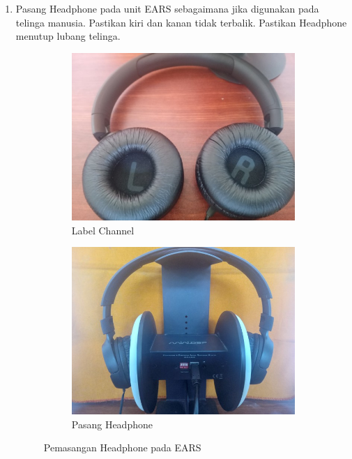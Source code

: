 \documentclass{article}
\begin{document}
	\begin{enumerate}
		\item Pasang Headphone pada unit EARS sebagaimana jika digunakan pada telinga manusia.
		Pastikan kiri dan kanan tidak terbalik.
		Pastikan Headphone menutup lubang telinga.
		
		\begin{figure}[H]
			\centering
			\begin{subfigure}[H]{0.4\textwidth}
				\includegraphics[width=\textwidth]{images/pasang/chjbl}
				\caption{Label Channel}
			\end{subfigure}
			\begin{subfigure}[H]{0.4\textwidth}
				\includegraphics[width=\textwidth]{images/pasang/pasangjbl}
				\caption{Pasang Headphone}
			\end{subfigure}			
			\caption{Pemasangan Headphone pada EARS}
		\end{figure}
		

\end{enumerate}
\end{document}
